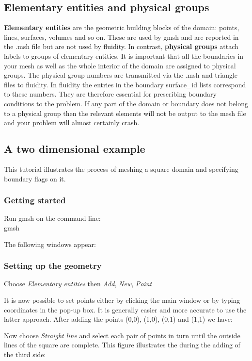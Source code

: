 \subsection{Elementary entities and physical groups}
\textbf{Elementary entities} are the geometric building blocks of the
domain: points, lines, surfaces, volumes and so on. These are used by gmsh
and are reported in the .msh file but are not used by fluidity. In contrast,
\textbf{physical groups} attach labels to groups of elementary entities. It
is important that all the boundaries in your mesh as well as the whole
interior of the domain are assigned to physical groups. The physical group
numbers are transmitted via the .msh and triangle files to fluidity. In
fluidity the entries in the boundary surface\_id lists correspond to these
numbers. They are therefore essential for prescribing boundary conditions to
the problem. If any part of the domain or boundary does not belong to a
physical group then the relevant elements will not be output to the mesh
file and your problem will almost certainly crash.

\subsection{A two dimensional example}
This tutorial illustrates the process of meshing a square domain and specifying boundary flags on it.

\subsubsection{Getting started}

Run gmsh on the command line: \\

gmsh

The following windows appear: %

\subsubsection{Setting up the geometry}

Choose \textit{Elementary entities} then \textit{Add}, \textit{New},
\textit{Point}
		
It is now possible to set points either by clicking the main window or by
typing coordinates in the pop-up box. It is generally easier and more
accurate to use the latter approach. After adding the points (0,0), (1,0),
(0,1) and (1,1) we have:

Now choose \textit{Straight line} and select each pair of points in turn
until the outside lines of the square are complete. This figure illustrates
the during the adding of the third side:

